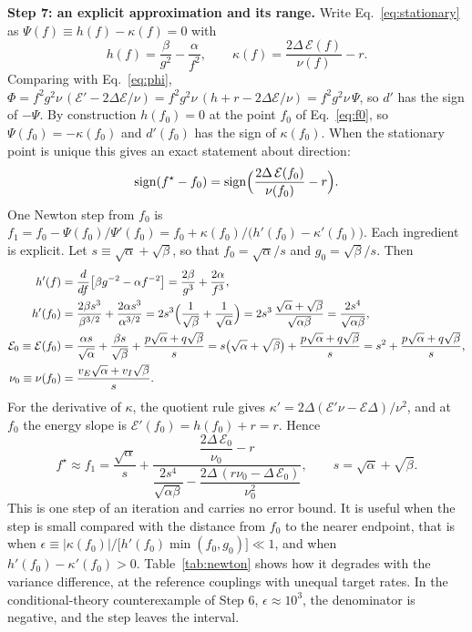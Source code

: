 \documentclass[11pt]{article}
\newcommand{\energy}{\mathcal E}
\begin{document}
\textbf{Step 7: an explicit approximation and its range.} Write Eq.~\eqref{eq:stationary} as $\Psi(f)\equiv h(f)-\kappa(f)=0$ with
\[
 h(f)=\frac{\beta}{g^2}-\frac{\alpha}{f^2},\qquad
 \kappa(f)=\frac{2\Delta\,\energy(f)}{\nu(f)}-r .
\]
Comparing with Eq.~\eqref{eq:phi}, $\Phi=f^2g^2\nu\,(\energy'-2\Delta\energy/\nu)=f^2g^2\nu\,(h+r-2\Delta\energy/\nu)=f^2g^2\nu\,\Psi$, so $d'$ has the sign of $-\Psi$. By construction $h(f_0)=0$ at the point $f_0$ of Eq.~\eqref{eq:f0}, so $\Psi(f_0)=-\kappa(f_0)$ and $d'(f_0)$ has the sign of $\kappa(f_0)$. When the stationary point is unique this gives an exact statement about direction:
\[
 \operatorname{sign}(f^\star-f_0)=\operatorname{sign}\Bigl(\frac{2\Delta\,\energy(f_0)}{\nu(f_0)}-r\Bigr).
\]
One Newton step from $f_0$ is $f_1=f_0-\Psi(f_0)/\Psi'(f_0)=f_0+\kappa(f_0)/\bigl(h'(f_0)-\kappa'(f_0)\bigr)$. Each ingredient is explicit. Let $s\equiv\sqrt\alpha+\sqrt\beta$, so that $f_0=\sqrt\alpha/s$ and $g_0=\sqrt\beta/s$. Then
\begin{align*}
 h'(f)&=\frac{d}{df}\bigl[\beta g^{-2}-\alpha f^{-2}\bigr]=\frac{2\beta}{g^3}+\frac{2\alpha}{f^3},\\
 h'(f_0)&=\frac{2\beta s^3}{\beta^{3/2}}+\frac{2\alpha s^3}{\alpha^{3/2}}
  =2s^3\Bigl(\frac1{\sqrt\beta}+\frac1{\sqrt\alpha}\Bigr)
  =2s^3\,\frac{\sqrt\alpha+\sqrt\beta}{\sqrt{\alpha\beta}}
  =\frac{2s^4}{\sqrt{\alpha\beta}},\\
 \energy_0\equiv\energy(f_0)&=\frac{\alpha s}{\sqrt\alpha}+\frac{\beta s}{\sqrt\beta}+\frac{p\sqrt\alpha+q\sqrt\beta}{s}
  =s\bigl(\sqrt\alpha+\sqrt\beta\bigr)+\frac{p\sqrt\alpha+q\sqrt\beta}{s}
  =s^2+\frac{p\sqrt\alpha+q\sqrt\beta}{s},\\
 \nu_0\equiv\nu(f_0)&=\frac{v_E\sqrt\alpha+v_I\sqrt\beta}{s}.
\end{align*}
For the derivative of $\kappa$, the quotient rule gives $\kappa'=2\Delta(\energy'\nu-\energy\Delta)/\nu^2$, and at $f_0$ the energy slope is $\energy'(f_0)=h(f_0)+r=r$. Hence
\begin{equation}
 \boxed{\;
 f^\star\approx f_1=\frac{\sqrt\alpha}{s}
 +\frac{\dfrac{2\Delta\,\energy_0}{\nu_0}-r}
       {\dfrac{2s^4}{\sqrt{\alpha\beta}}-\dfrac{2\Delta\,(r\nu_0-\Delta\,\energy_0)}{\nu_0^2}},
 \qquad s=\sqrt\alpha+\sqrt\beta .\;}
 \label{eq:newton}
\end{equation}
This is one step of an iteration and carries no error bound. It is useful when the step is small compared with the distance from $f_0$ to the nearer endpoint, that is when
$\epsilon\equiv|\kappa(f_0)|/\bigl[h'(f_0)\min(f_0,g_0)\bigr]\ll1$, and when $h'(f_0)-\kappa'(f_0)>0$. Table~\ref{tab:newton} shows how it degrades with the variance difference, at the reference couplings with unequal target rates. In the conditional-theory counterexample of Step 6, $\epsilon\approx10^{3}$, the denominator is negative, and the step leaves the interval.
\end{document}
